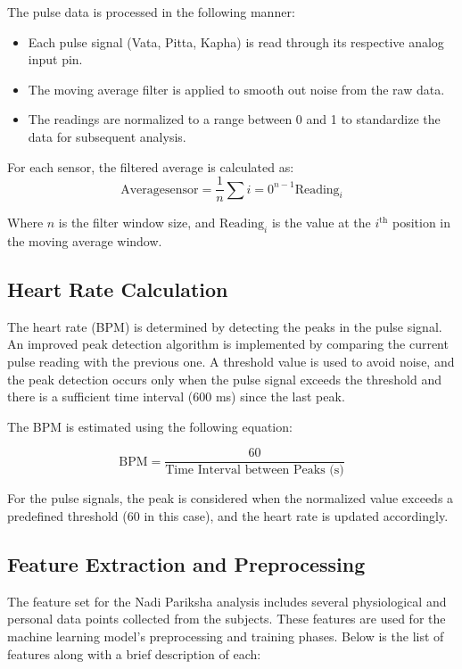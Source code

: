 \documentclass[10pt,twocolumn]{article}
\begin{document}
The pulse data is processed in the following manner:
\begin{itemize}
    \item Each pulse signal (Vata, Pitta, Kapha) is read through its respective analog input pin.
    \item The moving average filter is applied to smooth out noise from the raw data.
    \item The readings are normalized to a range between 0 and 1 to standardize the data for subsequent analysis.
\end{itemize}

For each sensor, the filtered average is calculated as:
\[
\text{Average}{\text{sensor}} = \frac{1}{n} \sum{i=0}^{n-1} \text{Reading}_{i}
\]

Where \(n\) is the filter window size, and \(\text{Reading}_{i}\) is the value at the \(i^{\text{th}}\) position in the moving average window.

\subsection{Heart Rate Calculation}

The heart rate (BPM) is determined by detecting the peaks in the pulse signal. An improved peak detection algorithm is implemented by comparing the current pulse reading with the previous one. A threshold value is used to avoid noise, and the peak detection occurs only when the pulse signal exceeds the threshold and there is a sufficient time interval (600 ms) since the last peak.

The BPM is estimated using the following equation:

\[
\text{BPM} = \frac{60}{\text{Time Interval between Peaks (s)}}
\]

For the pulse signals, the peak is considered when the normalized value exceeds a predefined threshold (60 in this case), and the heart rate is updated accordingly.

\subsection{Feature Extraction and Preprocessing}

The feature set for the Nadi Pariksha analysis includes several physiological and personal data points collected from the subjects. These features are used for the machine learning model's preprocessing and training phases. Below is the list of features along with a brief description of each:
\end{document}
